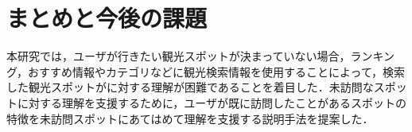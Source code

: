 \documentclass{deimj}
\begin{document}
%


\section{まとめと今後の課題}
\label{sec:まとめと今後の課題}
本研究では，ユーザが行きたい観光スポットが決まっていない場合，ランキング，おすすめ情報やカテゴリなどに観光検索情報を使用することによって，検索した観光スポットがに対する理解が困難であることを着目した．未訪問なスポットに対する理解を支援するために，ユーザが既に訪問したことがあるスポットの特徴を未訪問スポットにあてはめて理解を支援する説明手法を提案した．
\end{document}
